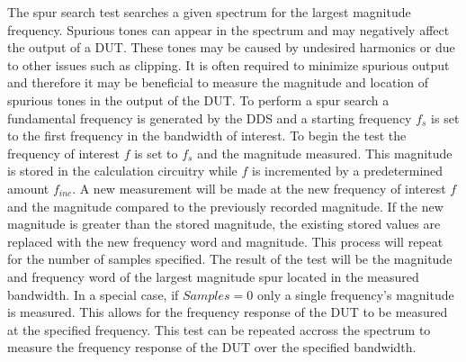 \documentclass[12pt]{report}
\begin{document}
The spur search test searches a given spectrum for the largest magnitude frequency.  Spurious tones can appear in the spectrum and may negatively affect the output of a DUT.  These tones may be caused by undesired harmonics or due to other issues such as clipping.  It is often required to minimize spurious output and therefore it may be beneficial to measure the magnitude and location of spurious tones in the output of the DUT\cite{joey}.  To perform a spur search a fundamental frequency is generated by the DDS and a starting frequency $f_s$ is set to the first frequency in the bandwidth of interest.  To begin the test the frequency of interest $f$ is set to $f_s$ and the magnitude measured.  This magnitude is stored in the calculation circuitry while $f$ is incremented by a predetermined amount $f_{inc}$.  A new measurement will be made at the new frequency of interest $f$ and the magnitude compared to the previously recorded magnitude.  If the new magnitude is greater than the stored magnitude, the existing stored values are replaced with the new frequency word and magnitude.  This process will repeat for the number of samples specified.  The result of the test will be the magnitude and frequency word of the largest magnitude spur located in the measured bandwidth.  In a special case, if $Samples = 0$ only a single frequency's magnitude is measured.  This allows for the frequency response of the DUT to be measured at the specified frequency.  This test can be repeated accross the spectrum to measure the frequency response of the DUT over the specified bandwidth\cite{stroud-automaticlinearity}.
\end{document}
